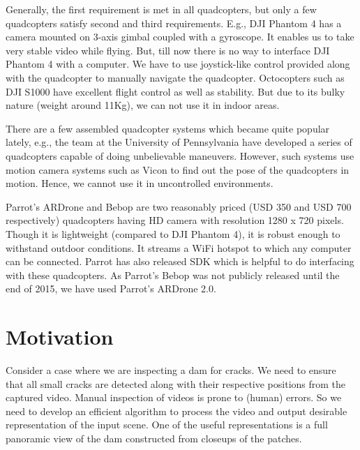 Generally, the first requirement is met in all quadcopters, but only a few
quadcopters satisfy second and third requirements. E.g., DJI Phantom 4
 has a camera mounted on 3-axis gimbal coupled with a gyroscope. It enables
us to take very stable video while flying. But, till now there is no way to interface DJI
Phantom 4 with a computer. We have to use joystick-like control provided along
with the quadcopter to manually navigate the quadcopter.
Octocopters such as  DJI S1000 have excellent flight control as well as
stability. But due to its bulky nature (weight around 11Kg), we can not use it
in indoor areas.



There are a few assembled quadcopter systems which became quite popular lately,
e.g., the team at the University of Pennsylvania have developed a series of
quadcopters capable of doing unbelievable maneuvers. However, such systems use motion camera
systems such as Vicon to find out the pose of the quadcopters in motion.
Hence, we cannot use it in uncontrolled environments.

Parrot's ARDrone and Bebop are two reasonably priced (USD 350 and USD
700 respectively) quadcopters having HD camera with resolution 1280 x 720
pixels. Though it is lightweight (compared to DJI Phantom 4), it is robust
enough to withstand outdoor conditions. It streams a WiFi hotspot to which
any computer can be connected. Parrot has also released SDK which is helpful to
do interfacing with these quadcopters. As Parrot's Bebop was not publicly
released until the end of 2015, we have used Parrot's ARDrone 2.0.

\section{Motivation}

Consider a case where  we are inspecting a dam for cracks. We need to ensure
that all small cracks are detected along with their respective positions from
the captured video. Manual inspection of videos is prone to (human) errors. 
So we need to develop an efficient algorithm to process the video and output
desirable representation of the input scene. One of the useful representations
is a full panoramic view of the dam constructed from closeups of the patches. 

